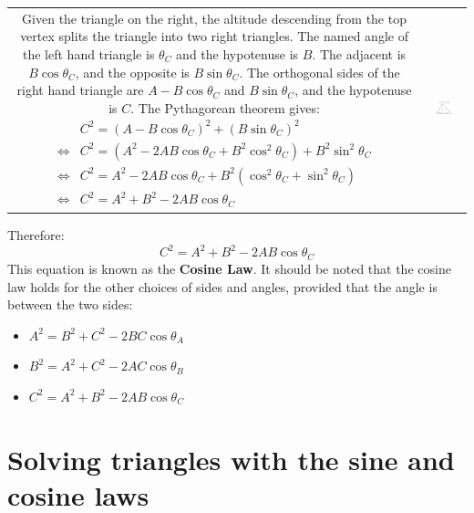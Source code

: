 \documentclass{article}
\begin{document}
\begin{tabular}{cc}
\parbox{0.5\textwidth}{
Given the triangle on the right, the altitude descending from the top vertex splits the triangle into two right triangles. The named angle of the left hand triangle is \(\theta_C\) and the hypotenuse is \(B\). The adjacent is \(B\cos\theta_C\), and the opposite is \(B\sin\theta_C\). The orthogonal sides of the right hand triangle are \(A - B\cos\theta_C\) and \(B\sin\theta_C\), and the hypotenuse is \(C\). The Pythagorean theorem gives:
\begin{align*}
& C^2 = (A - B\cos\theta_C)^2 + (B\sin\theta_C)^2 \\
\iff & C^2 = (A^2 - 2AB\cos\theta_C + B^2\cos^2\theta_C) + B^2\sin^2\theta_C \\
\iff & C^2 = A^2 - 2AB\cos\theta_C + B^2(\cos^2\theta_C + \sin^2\theta_C) \\
\iff & C^2 = A^2 + B^2 - 2AB\cos\theta_C
\end{align*}
} & \parbox{0.5\textwidth}{
\includegraphics[width = 0.5\textwidth]{cosine_law_for_triangles}
}
\end{tabular}

Therefore:
\[C^2 = A^2 + B^2 - 2AB\cos\theta_C\]
This equation is known as the {\bf Cosine Law}. It should be noted that the cosine law holds for the other choices of sides and angles, provided that the angle is between the two sides:
\begin{itemize}
\item \(A^2 = B^2 + C^2 - 2BC\cos\theta_A\)
\item \(B^2 = A^2 + C^2 - 2AC\cos\theta_B\)
\item \(C^2 = A^2 + B^2 - 2AB\cos\theta_C\)
\end{itemize}




\section*{Solving triangles with the sine and cosine laws}
\end{document}
